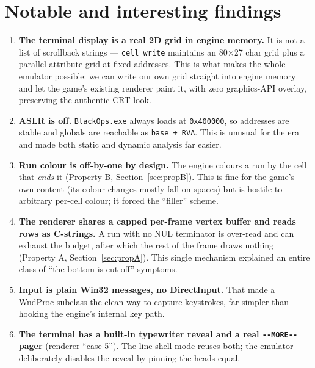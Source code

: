 \documentclass[11pt]{article}
\newcommand{\ic}[1]{\texttt{#1}}
\begin{document}
\section{Notable and interesting findings}

\begin{enumerate}[label=\textbf{F\arabic*.},leftmargin=*]
  \item \textbf{The terminal display is a real 2D grid in engine memory.} It is not a
  list of scrollback strings --- \ic{cell_write} maintains an 80$\times$27 char grid plus a
  parallel attribute grid at fixed addresses. This is what makes the whole emulator
  possible: we can write our own grid straight into engine memory and let the game's
  existing renderer paint it, with zero graphics-API overlay, preserving the authentic
  CRT look.

  \item \textbf{ASLR is off.} \texttt{BlackOps.exe} always loads at \texttt{0x400000},
  so addresses are stable and globals are reachable as \ic{base + RVA}. This is unusual
  for the era and made both static and dynamic analysis far easier.

  \item \textbf{Run colour is off-by-one by design.} The engine colours a run by the
  cell that \emph{ends} it (Property B, Section~\ref{sec:propB}). This is fine for the
  game's own content (its colour changes mostly fall on spaces) but is hostile to
  arbitrary per-cell colour; it forced the ``filler'' scheme.

  \item \textbf{The renderer shares a capped per-frame vertex buffer and reads rows as
  C-strings.} A run with no NUL terminator is over-read and can exhaust the budget,
  after which the rest of the frame draws nothing (Property A, Section~\ref{sec:propA}).
  This single mechanism explained an entire class of ``the bottom is cut off'' symptoms.

  \item \textbf{Input is plain Win32 messages, no DirectInput.} That made a WndProc
  subclass the clean way to capture keystrokes, far simpler than hooking the engine's
  internal key path.

  \item \textbf{The terminal has a built-in typewriter reveal and a real
  \texttt{-{}-MORE-{}-} pager} (renderer ``case 5''). The line-shell mode reuses both;
  the emulator deliberately disables the reveal by pinning the heads equal.


\end{enumerate}
\end{document}
